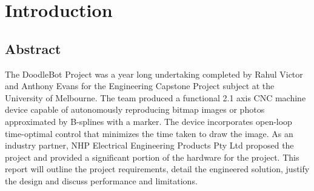
\chapter{Introduction}
\label{ch:intro}




\section{Abstract}
The DoodleBot Project was a year long undertaking completed by Rahul Victor and Anthony Evans for the  Engineering Capstone Project subject at the University of Melbourne. The team produced a functional 2.1 axis CNC machine device capable of autonomously reproducing bitmap images or photos approximated by B-splines with a marker. The device incorporates open-loop time-optimal control that minimizes the time taken to draw the image. As an industry partner, NHP Electrical Engineering Products Pty Ltd proposed the project and provided a significant portion of the hardware for the project. This report will outline the project requirements, detail the engineered solution, justify the design and discuss performance and limitations. 

